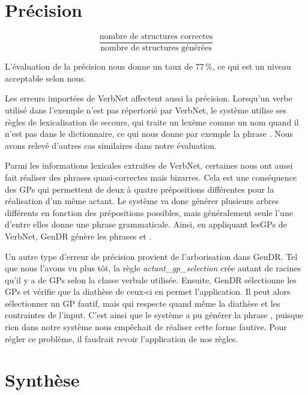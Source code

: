 \section{Précision}

\[\frac{\text{nombre de structures correctes}}{\text{nombre de structures générées}}\]

L'évaluation de la précision nous donne un taux de 77\,\%, ce qui est un niveau acceptable selon nous.


Les erreurs importées de VerbNet affectent aussi la précision. Lorsqu'un verbe utilisé dans l'exemple n'est pas répertorié par VerbNet, le système utilise ses règles de lexicalisation  de secours, qui traite un lexème comme un nom quand il n'est pas dans le dictionnaire, ce qui nous donne par exemple la phrase \ungr{}. Nous avons relevé d'autres cas similaires dans notre évaluation.

Parmi les informations lexicales extraites de VerbNet, certaines nous ont aussi fait réaliser des phrases quasi-correctes mais bizarres. Cela est une conséquence des \acp{GP} qui permettent de deux à quatre prépositions différentes pour la réalisation d'un même actant. Le système va donc générer plusieurs arbres différents en fonction des prépositions possibles, mais généralement seule l'une d'entre elles donne une phrase grammaticale. Ainsi, en appliquant les\acp{GP} de VerbNet, GenDR génère les phrases  et \ungr{}.

Un autre type d'erreur de précision provient de l'arborisation dans GenDR. Tel que nous l'avons vu plus tôt, la règle \emph{actant\_gp\_selection} crée autant de racines qu'il y a de \acp{GP} selon la classe verbale utilisée. Ensuite, GenDR sélectionne les \acp{GP} et vérifie que la diathèse de ceux-ci en permet l'application. Il peut alors sélectionner un \ac{GP} fautif, mais qui respecte quand même la diathèse et les contraintes de l'input. C'est ainsi que le système a pu générer la phrase \ungr{}, puisque rien dans notre système nous empêchait de réaliser cette forme fautive. Pour régler ce problème, il faudrait revoir l'application de nos règles.

\section{Synthèse}

